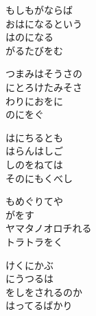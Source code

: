 \documentclass[10pt,b5j]{tarticle} %
\begin{document}
\vspace{1.5em} %
\newcommand{\linespace}{0.5em} %
\newcommand{\blocksize}{0.5\hsize} %
\begin{enumerate} %
    \begin{minipage}[c]{\blocksize}
    
        \vspace{\linespace}
        \item
        もしもがならば\\
        おはになるという\\
        はのになる\\
        がるたびをむ
        
        \vspace{\linespace}
        \item
        つまみはそうさの\\
        にとろけたみそさ\\
        わりにおをに\\
        のにをぐ
        
        \vspace{\linespace}
        \item
        はにちるとも\\
        はらんはしご\\
        しのをねては\\
        そのにもくべし
        
        \vspace{\linespace}
        \item
        もめぐりてや\\
        がをす\\
        ヤマタノオロチれる\\
        トラトラをく
        
        \vspace{\linespace}
        \item
        けくにかぶ\\
        にうつるは\\
        をしをされるのか\\
        はってるばかり
        

\end{minipage}
\end{enumerate}
\end{document}
